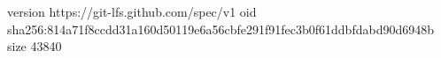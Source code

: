 version https://git-lfs.github.com/spec/v1
oid sha256:814a71f8ccdd31a160d50119e6a56cbfe291f91fec3b0f61ddbfdabd90d6948b
size 43840
